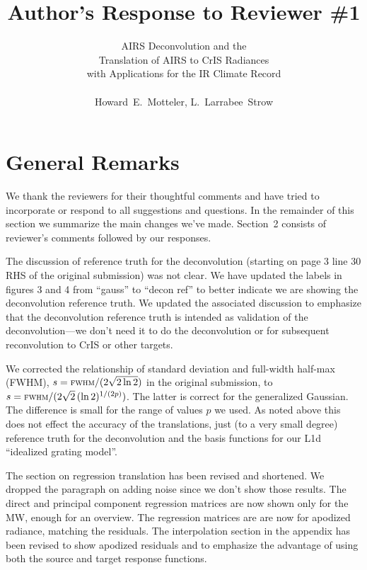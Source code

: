 \documentclass[11pt]{article}
\begin{document}
\title{Author's Response to Reviewer \#1 }

\author{AIRS Deconvolution and the \\
       Translation of AIRS to CrIS Radiances \\ 
       with Applications for the IR Climate Record \\
       \\
       Howard~E.~Motteler, L.~Larrabee~Strow}

\maketitle

\section{General Remarks}

We thank the reviewers for their thoughtful comments and have tried
to incorporate or respond to all suggestions and questions.  In the
remainder of this section we summarize the main changes we've made.
Section~2 consists of reviewer's comments followed by our responses.


The discussion of reference truth for the deconvolution (starting on
page 3 line 30 RHS of the original submission) was not clear.  We
have updated the labels in figures 3 and 4 from ``gauss'' to ``decon
ref'' to better indicate we are showing the deconvolution reference
truth.  We updated the associated discussion to emphasize that the
deconvolution reference truth is intended as validation of the
deconvolution---we don't need it to do the deconvolution or for
subsequent reconvolution to CrIS or other targets.

We corrected the relationship of standard deviation and full-width
half-max (FWHM), $s=\mbox{\small\textsc{fwhm}} / (2\sqrt{2\ln 2})$ in the original
submission, to $s=\mbox{\small\textsc{fwhm}} / (2\sqrt{2}\,(\ln 2)^{1/(2p)})$.  The
latter is correct for the generalized Gaussian.  The difference is
small for the range of values $p$ we used.  As noted above this does
not effect the accuracy of the translations, just (to a very small
degree) reference truth for the deconvolution and the basis
functions for our L1d ``idealized grating model''.

The section on regression translation has been revised and
shortened.  We dropped the paragraph on adding noise since we don't
show those results.  The direct and principal component regression
matrices are now shown only for the MW, enough for an overview.  
The regression matrices are are now for apodized radiance, matching
the residuals.  The interpolation section in the appendix has been
revised to show apodized residuals and to emphasize the advantage of
using both the source and target response functions.
\end{document}
